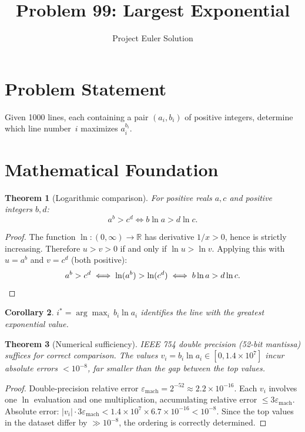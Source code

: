 \documentclass[12pt]{article}
\title{Problem 99: Largest Exponential}
\author{Project Euler Solution}
\date{}
\newtheorem{theorem}{Theorem}
\newtheorem{corollary}[theorem]{Corollary}
\begin{document}
\maketitle

\section{Problem Statement}
Given 1000 lines, each containing a pair $(a_i, b_i)$ of positive integers, determine which line number~$i$ maximizes $a_i^{b_i}$.

\section{Mathematical Foundation}

\begin{theorem}[Logarithmic comparison]
\label{thm:logcmp}
For positive reals $a, c$ and positive integers $b, d$:
\[
a^b > c^d \iff b \ln a > d \ln c.
\]
\end{theorem}
\begin{proof}
The function $\ln : (0,\infty) \to \mathbb{R}$ has derivative $1/x > 0$, hence is strictly increasing. Therefore $u > v > 0$ if and only if $\ln u > \ln v$. Applying this with $u = a^b$ and $v = c^d$ (both positive):
\[
a^b > c^d \iff \ln(a^b) > \ln(c^d) \iff b \ln a > d \ln c. \qedhere
\]
\end{proof}

\begin{corollary}
$i^* = \arg\max_i\, b_i \ln a_i$ identifies the line with the greatest exponential value.
\end{corollary}

\begin{theorem}[Numerical sufficiency]
IEEE 754 double precision (52-bit mantissa) suffices for correct comparison. The values $v_i = b_i \ln a_i \in [0, 1.4 \times 10^7]$ incur absolute errors $< 10^{-8}$, far smaller than the gap between the top values.
\end{theorem}
\begin{proof}
Double-precision relative error $\varepsilon_{\text{mach}} = 2^{-52} \approx 2.2 \times 10^{-16}$. Each $v_i$ involves one $\ln$ evaluation and one multiplication, accumulating relative error $\le 3\varepsilon_{\text{mach}}$. Absolute error: $|v_i| \cdot 3\varepsilon_{\text{mach}} < 1.4 \times 10^7 \times 6.7 \times 10^{-16} < 10^{-8}$. Since the top values in the dataset differ by $\gg 10^{-8}$, the ordering is correctly determined.
\end{proof}
\end{document}
